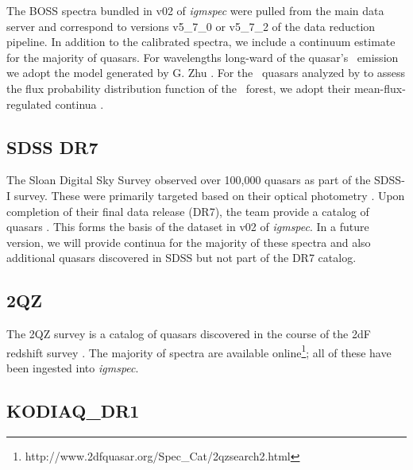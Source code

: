 \documentclass[12pt]{elsarticle}
\begin{document}
The BOSS spectra bundled in v02 of {\it igmspec} were pulled
from the main data server and correspond to versions 
v5\_7\_0 or v5\_7\_2 of the data reduction pipeline.
In addition to the calibrated spectra, we include a
continuum estimate for the majority of quasars.  
For wavelengths long-ward of the quasar's \lya\ emission we adopt
the model generated by G. Zhu 
\citep[see][for details on the algorithm]{zhu15}.
For the \nlee~quasars analyzed by \cite{lee+13} to assess
the flux probability distribution function of the 
\lya\ forest, we adopt their mean-flux-regulated continua
\citep{lee+12}.

%
\subsection{SDSS DR7}
\label{sec:dr7}

The Sloan Digital Sky Survey observed over 100,000 quasars
as part of the SDSS-I survey.  These were primarily targeted
based on their optical photometry \citep[e.g.][]{richards09}.  
Upon completion of their final data release (DR7),
the team provide a catalog of quasars \citep{sdss_qso_dr7}.
This forms the basis of the dataset in v02 of {\it igmspec}.
In a future version, we will provide continua for the majority
of these spectra and also additional quasars discovered in 
SDSS but not part of the DR7 catalog.



\subsection{2QZ}
\label{sec:2qz}

The 2QZ survey is a catalog of quasars discovered in the 
course of the 2dF redshift survey \citep{croom01}.  The
majority of spectra are available online\footnote{http://www.2dfquasar.org/Spec\_Cat/2qzsearch2.html};
all of these have been ingested into {\it igmspec}.


\subsection{KODIAQ\_DR1}
\label{sec:kodiaq}
\end{document}
